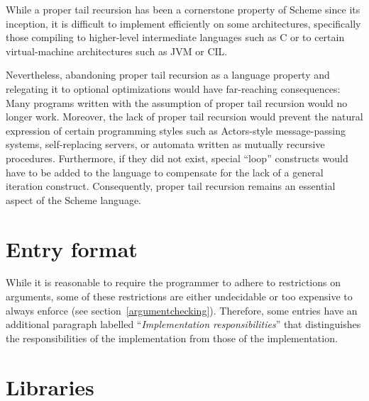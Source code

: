 \documentclass[twoside,twocolumn]{algol60}
\begin{document}
While a proper tail recursion has been a cornerstone property of
Scheme since its inception, it is difficult to implement efficiently
on some architectures, specifically those compiling to higher-level
intermediate languages such as C or to certain virtual-machine
architectures such as JVM or CIL.

Nevertheless, abandoning proper tail recursion as a language property
and relegating it to optional optimizations would have far-reaching
consequences: Many programs written with the assumption of proper tail
recursion would no longer work.  Moreover, the lack of proper tail
recursion would prevent the natural expression of certain programming
styles such as Actors-style message-passing systems, self-replacing
servers, or automata written as mutually recursive procedures.
Furthermore, if they did not exist, special ``loop'' constructs would
have to be added to the language to compensate for the lack of a general
iteration construct.  Consequently, proper tail recursion remains an
essential aspect of the Scheme language.

\chapter{Entry format}

While it is reasonable to require the programmer to adhere to
restrictions on arguments, some of these restrictions are either
undecidable or too expensive to always enforce (see
section~\ref{argumentchecking}).  Therefore, some entries have
an additional paragraph labelled ``\textit{Implementation
  responsibilities}'' that distinguishes the responsibilities of the
implementation from those of the implementation.

\chapter{Libraries}
\end{document}
